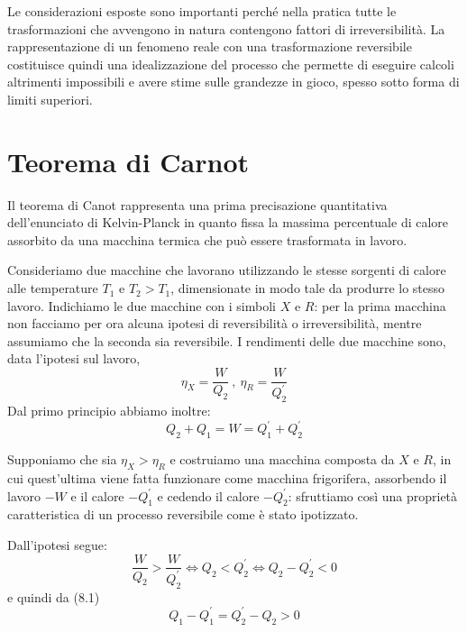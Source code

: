 \documentclass[class=book, crop=false, oneside, 12pt]{standalone}
\begin{document}
Le considerazioni esposte sono importanti perché nella pratica tutte le trasformazioni che avvengono in natura contengono fattori di irreversibilità.  
La rappresentazione di un fenomeno reale con una trasformazione reversibile costituisce quindi una idealizzazione del processo che permette di eseguire calcoli altrimenti impossibili e avere stime sulle grandezze in gioco, spesso sotto forma di limiti superiori.

\section{Teorema di Carnot}

Il teorema di Canot rappresenta una prima precisazione quantitativa dell'enunciato di Kelvin-Planck in quanto fissa la massima percentuale di calore assorbito da una macchina termica che può essere trasformata in lavoro.

Consideriamo due macchine che lavorano utilizzando le stesse sorgenti di calore alle temperature \(T_1\) e \(T_2>T_1\), dimensionate in modo tale da produrre lo stesso lavoro. 
Indichiamo le due macchine con i simboli \(X\) e \(R\): per la prima macchina non facciamo per ora alcuna ipotesi di reversibilità o irreversibilità, mentre assumiamo che la seconda sia reversibile. 
I rendimenti delle due macchine sono, data l'ipotesi sul lavoro,
\begin{equation*}
    \eta_X = \frac{W}{Q_2} \ , \ \eta_R = \frac{W}{Q^{\prime}_2}
\end{equation*}
Dal primo principio abbiamo inoltre:
\begin{equation}
    Q_2 + Q_1 = W = Q_1^{\prime} + Q_2^{\prime}
\end{equation}

Supponiamo che sia \(\eta_X > \eta_R\) e costruiamo una macchina composta da \(X\) e \(R\), in cui quest'ultima viene fatta funzionare come macchina frigorifera, assorbendo il lavoro \(-W\) e il calore \(-Q^{\prime}_1\) e cedendo il calore \(-Q_2^{\prime}\):
sfruttiamo così una proprietà caratteristica di un processo reversibile come è stato ipotizzato.

Dall'ipotesi segue:
\begin{equation*}
    \frac{W}{Q_2} > \frac{W}{Q_2^{\prime}} \Leftrightarrow Q_2 < Q_2^{\prime} \Leftrightarrow Q_2 - Q_2^{\prime} < 0
\end{equation*}
e quindi da (8.1)
\begin{equation*}
    Q_1 - Q_1^{\prime} = Q_2^{\prime} - Q_2 > 0 
\end{equation*}
\end{document}
